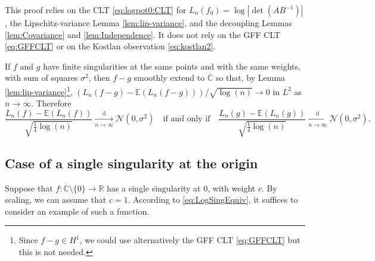 \documentclass[10pt,reqno]{amsart}
\numberwithin{equation}{section}
\numberwithin{figure}{section}
\theoremstyle{plain}
\newcommand{\<}{\langle}
\renewcommand{\>}{\rangle}
\begin{document}
This proof relies on the CLT \eqref{eq:logpot0:CLT} for $L_n(f_0)=\log|\det(AB^{-1})|$, the Lipschitz-variance Lemma \ref{lem:lip-variance}, and the decoupling Lemmas \ref{lem:Covariance} and \ref{lem:Independence}. It does not rely on the GFF CLT \eqref{eq:GFFCLT} or on the Kostlan observation \eqref{eq:kostlan2}.

%

%
%
%
%
%
%
%
%

If $f$ and $g$ have finite singularities at the same points and with the same weights, with sum of squares $\sigma^2$, then $f-g$ smoothly extend to $\overline{\mathbb C}$ so that, by  Lemma \ref{lem:lip-variance}\footnote{Since $f-g\in H^1$, we could use alternatively the GFF CLT \eqref{eq:GFFCLT} but this is not needed.}, $(L_n(f-g)-\mathbb{E}(L_n(f-g)))/\sqrt{\log(n)}\to0$ in $L^2$ as $n\to\infty$. Therefore
\begin{equation}\label{eq:LogSingEquiv}
    \frac{L_n(f)-\mathbb{E}(L_n(f))}{\sqrt{\frac{1}{4}\log(n)}}
    \xrightarrow[n\to\infty]{\mathrm{d}}
    \mathcal{N}(0,\sigma^2)
    \quad\text{if and only if}\quad
    \frac{L_n(g)-\mathbb{E}(L_n(g))}{\sqrt{\frac{1}{4}\log(n)}}
    \xrightarrow[n\to\infty]{\mathrm{d}}
    \mathcal{N}(0,\sigma^2).
\end{equation}

\subsection{Case of a single singularity at the origin}
\label{sub:SingleSingularity}

Suppose that $f:\overline{\mathbb{C}}\setminus\{0\}\to\mathbb{R}$ has a single singularity at $0$, with weight $c$. By scaling, we can assume that $c=1$. According to \eqref{eq:LogSingEquiv}, it suffices to consider an example of such a function.
\end{document}
